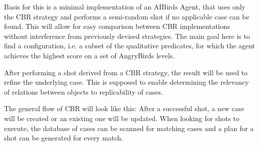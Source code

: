 Basis for this is a minimal implementation of an AIBirds Agent, that uses only the CBR strategy and performs a semi-random shot if no applicable case can be found.
This will allow for easy comparison between CBR implementations without interference from previously devised strategies.
The main goal here is to find a configuration, i.e. a subset of the qualitative predicates, for which the agent achieves the highest score on a set of AngryBirds levels.

After performing a shot derived from a CBR strategy, the result will be used to refine the underlying case.
This is supposed to enable determining the relevancy of relations between objects to replicability of cases.

The general flow of CBR will look like this: After a successful shot, a new case will be created or an existing one will be updated. When looking for shots to execute, the database of cases can be scanned for matching cases and a plan for a shot can be generated for every match.